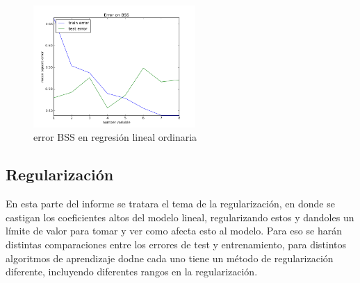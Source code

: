 \documentclass[10pt]{article}
\begin{document}
\begin{itemize}
\begin{figure}[h]
    \centering
    \includegraphics[width=0.55\textwidth]{images/bss}
    \caption{error BSS en regresión lineal ordinaria}
    \label{fig:mesh1}
\end{figure}
\end{itemize}

\subsection{Regularización}

En esta parte del informe se tratara el tema de la regularización, en donde se castigan los coeficientes altos del modelo lineal, regularizando estos y dandoles un límite de valor para tomar y ver como afecta esto al modelo. Para eso se harán distintas comparaciones entre los errores de test y entrenamiento, para distintos algoritmos de aprendizaje dodne cada uno tiene un método de regularización diferente, incluyendo diferentes rangos en la regularización.
 
\end{document}
